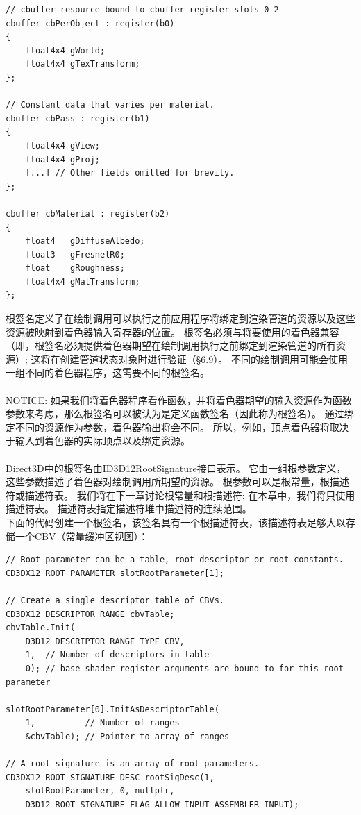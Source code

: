 \documentclass[11pt,a4paper,oldfontcommands]{memoir}
\begin{document}
{\begin{flushleft}
\begin{lstlisting}
// cbuffer resource bound to cbuffer register slots 0-2
cbuffer cbPerObject : register(b0)
{
    float4x4 gWorld;
    float4x4 gTexTransform;
};

// Constant data that varies per material.
cbuffer cbPass : register(b1)
{
    float4x4 gView;
    float4x4 gProj;
    [...] // Other fields omitted for brevity.
};

cbuffer cbMaterial : register(b2)
{
    float4   gDiffuseAlbedo;
    float3   gFresnelR0;
    float    gRoughness;
    float4x4 gMatTransform;
};
\end{lstlisting}
根签名定义了在绘制调用可以执行之前应用程序将绑定到渲染管道的资源以及这些资源被映射到着色器输入寄存器的位置。 根签名必须与将要使用的着色器兼容（即，根签名必须提供着色器期望在绘制调用执行之前绑定到渲染管道的所有资源）; 这将在创建管道状态对象时进行验证（§6.9）。 不同的绘制调用可能会使用一组不同的着色器程序，这需要不同的根签名。\\
~\\
NOTICE: 如果我们将着色器程序看作函数，并将着色器期望的输入资源作为函数参数来考虑，那么根签名可以被认为是定义函数签名（因此称为根签名）。 通过绑定不同的资源作为参数，着色器输出将会不同。 所以，例如，顶点着色器将取决于输入到着色器的实际顶点以及绑定资源。\\
~\\
Direct3D中的根签名由ID3D12RootSignature接口表示。 它由一组根参数定义，这些参数描述了着色器对绘制调用所期望的资源。 根参数可以是根常量，根描述符或描述符表。 我们将在下一章讨论根常量和根描述符; 在本章中，我们将只使用描述符表。 描述符表指定描述符堆中描述符的连续范围。\\
下面的代码创建一个根签名，该签名具有一个根描述符表，该描述符表足够大以存储一个CBV（常量缓冲区视图）：\\
\begin{lstlisting}
// Root parameter can be a table, root descriptor or root constants.
CD3DX12_ROOT_PARAMETER slotRootParameter[1];

// Create a single descriptor table of CBVs.
CD3DX12_DESCRIPTOR_RANGE cbvTable;
cbvTable.Init(
    D3D12_DESCRIPTOR_RANGE_TYPE_CBV,
    1,  // Number of descriptors in table
    0); // base shader register arguments are bound to for this root parameter

slotRootParameter[0].InitAsDescriptorTable(
    1,          // Number of ranges
    &cbvTable); // Pointer to array of ranges

// A root signature is an array of root parameters.
CD3DX12_ROOT_SIGNATURE_DESC rootSigDesc(1, 
    slotRootParameter, 0, nullptr, 
    D3D12_ROOT_SIGNATURE_FLAG_ALLOW_INPUT_ASSEMBLER_INPUT);


\end{lstlisting}
\end{flushleft}}
\end{document}
